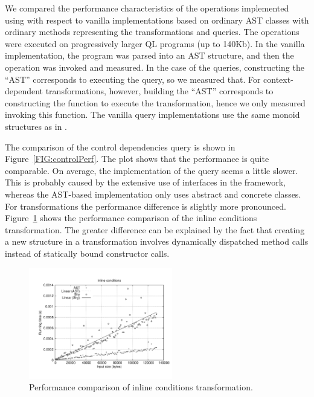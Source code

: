 We compared the performance characteristics of the operations implemented using \name with respect to vanilla implementations based on ordinary AST classes with ordinary methods representing the transformations and queries.
The operations were executed on progressively larger QL programs (up to 140Kb).
In the vanilla implementation, the program was parsed into an AST structure, and then the operation was invoked and measured.
In the case of the \name queries, constructing the ``AST'' corresponds to executing the query, so we measured that.
For context-dependent transformations, however, building the ``AST'' corresponds to constructing the function to execute the transformation, hence we only measured invoking this function.
The vanilla query implementations use the same monoid structures as in \name.

The comparison of the control dependencies query is shown in Figure~\ref{FIG:controlPerf}.
The plot shows that the performance is quite comparable.
On average, the \name implementation of the query seems a little slower.
This is probably caused by the extensive use of interfaces in the \name framework, whereas the AST-based implementation only uses abstract and concrete classes.
For transformations the performance difference is slightly more pronounced.
Figure~\ref{FIG:inlinePerf} shows the performance comparison of the inline conditions transformation.
The greater difference can be explained by the fact that creating a new structure in a \name transformation involves dynamically dispatched method calls instead of statically bound constructor calls.

\begin{figure}[t]
  \nocaptionrule
  \hspace*{-.05\textwidth}
  \includegraphics[width=0.56\textwidth]{plots/inline}
  \caption{Performance comparison of inline conditions transformation.\label{FIG:inlinePerf}}
\end{figure}





